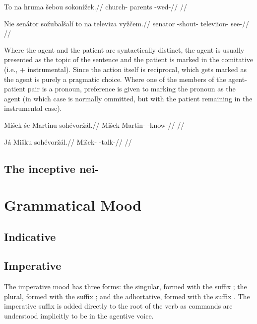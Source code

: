 \pex
\begingl
\gla To na hruma \v{s}ebou sokon\'i\v{z}ek.//
\glb {}  church- parents -wed-//
\glft {}//
\endgl
\xe

\pex
\begingl
\gla Nie sen\'ator so\v{z}ubal\v{s}al\'i to na televiza vy\v{z}\v{c}em.//
\glb {} senator -shout-   televiion- see-//
\glft {}//
\endgl
\xe

Where the agent and the patient are syntactically distinct, the agent is usually presented as the topic of the sentence and the patient is marked in the comitative (i.e.,  + instrumental). Since the action itself is reciprocal, which gets marked as the agent is purely a pragmatic choice. Where one of the members of the agent-patient pair is a pronoun, preference is given to marking the pronoun as the agent (in which case  is normally ommitted, but with the patient remaining in the instrumental case).

\pex
\begingl
\gla Mi\v{s}ek \v{s}e Martinu soh\'evor\v{z}\'al.//
\glb Mi\v{s}ek  Martin- -know-//
\glft {}//
\endgl
\xe

\pex
\begingl
\gla J\'a Mi\v{s}ku soh\'evor\v{z}\'al.//
\glb {} Mi\v{s}ek- -talk-//
\glft {}//
\endgl
\xe

\subsection{The inceptive nei-}
\section{Grammatical Mood}

\subsection{Indicative}

\subsection{Imperative}
The imperative mood has three forms: the singular, formed with the suffix ; the plural, formed with the suffix ; and the adhortative, formed with the suffix . The imperative suffix is added directly to the root of the verb as commands are understood implicitly to be in the agentive voice.


